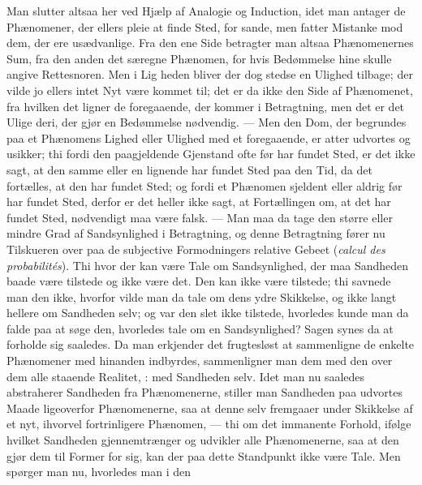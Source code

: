 \documentclass[12pt]{book}
\newcommand{\dsi}{\reflectbox{c}:}
\newcommand{\opage}[1]{\marginnote{\footnotesize\textit{[#1]}}}
\begin{document}
Man slutter altsaa her ved Hjælp af Analogie og Induction, idet man antager de
Phænomener, der ellers pleie at finde Sted, for sande, men fatter Mistanke mod
dem, der ere usædvanlige. Fra den ene Side betragter man altsaa Phænomenernes
Sum, fra den anden det særegne Phænomen, for hvis Bedømmelse hine skulle angive
Rettesnoren. Men i Lig%
\opage{15}heden bliver der dog stedse en Ulighed tilbage; der vilde jo ellers intet Nyt
være kommet til; det er da ikke den Side af Phænomenet, fra hvilken det ligner
de foregaaende, der kommer i Betragtning, men det er det Ulige deri, der gjør en
Bedømmelse nødvendig. --- Men den Dom, der begrundes paa et Phænomens Lighed
eller Ulighed med et foregaaende, er atter udvortes og usikker; thi fordi den
paagjeldende Gjenstand ofte før har fundet Sted, er det ikke sagt, at den samme
eller en lignende har fundet Sted paa den Tid, da det fortælles, at den har
fundet Sted; og fordi et Phænomen sjeldent eller aldrig før har fundet Sted,
derfor er det heller ikke sagt, at Fortællingen om, at det har fundet Sted,
nødvendigt maa være falsk. --- Man maa da tage den større eller mindre Grad af
Sandsynlighed i Betragtning, og denne Betragtning fører nu Tilskueren over paa
de subjective Formodningers relative Gebeet
(\textit{calcul des probabilités}). Thi hvor der kan være Tale om
Sandsynlighed, der maa Sandheden baade være tilstede og ikke være det. Den kan
ikke være tilstede; thi savnede man den ikke, hvorfor vilde man da tale om dens
ydre Skikkelse, og ikke langt hellere om Sandheden selv; og var den slet ikke
tilstede, hvorledes kunde man da falde paa at søge den, hvorledes tale om en
Sandsynlighed? Sagen synes da at forholde sig saaledes. Da man erkjender det
frugtesløst at sammenligne de enkelte Phænomener med hinanden indbyrdes,
sammenligner man dem med den over dem alle staaende Realitet, \dsi{} med
Sandheden selv. Idet man nu saaledes abstraherer Sandheden fra Phænomenerne,
stiller man Sandheden paa udvortes Maade ligeoverfor Phænomenerne, saa at denne
selv fremgaaer under Skikkelse af et nyt, ihvorvel fortrinligere Phænomen, ---
thi om det immanente Forhold, ifølge hvilket Sandheden gjennemtrænger og
udvikler alle Phænomenerne, saa at den gjør dem til Former for sig, kan
\opage{16}der paa dette Standpunkt ikke være Tale. Men spørger man nu, hvorledes man i den
\end{document}
